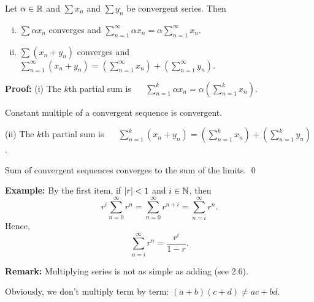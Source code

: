 \documentclass[10pt,aspectratio=149]{beamer}
\begin{document}
\begin{frame}

\begin{proposition}
Let $\alpha \in {\mathbb{R}}$ and $\sum x_n$ and $\sum y_n$ be
convergent series.
\pause
Then
\begin{enumerate}[(i)]
\item
$\sum \alpha x_n$ converges and \quad
$\displaystyle
\sum_{n=1}^\infty \alpha x_n
=
\alpha \sum_{n=1}^\infty x_n$.
\item\pause
$\sum ( x_n + y_n )$ converges and \quad
$\displaystyle
\sum_{n=1}^\infty ( x_n + y_n ) 
=
\left( \sum_{n=1}^\infty x_n \right)
+
\left( \sum_{n=1}^\infty y_n \right)$.
\end{enumerate}
\end{proposition}

\pause
\textbf{Proof:}
(i)
The $k$th partial sum is 
~~
$\displaystyle
\sum_{n=1}^k \alpha x_n
=
\alpha \left( \sum_{n=1}^k x_n \right)$.

\pause
\medskip

Constant multiple of a convergent sequence is convergent.

\pause
\medskip

(ii) The $k$th partial sum is
~~
$\displaystyle
\sum_{n=1}^k ( x_n + y_n ) 
=
\left( \sum_{n=1}^k x_n \right)
+
\left( \sum_{n=1}^k y_n \right)$.

\pause
\medskip

Sum of convergent sequences converges to the sum of the limits.
\qed

\end{frame}

\begin{frame}

\textbf{Example:}
By the first item, if $\left\lvert {r} \right\rvert < 1$ and $i \in {\mathbb{N}}$, then
\begin{equation*}
r^i \sum_{n=0}^\infty r^n =
\sum_{n=0}^\infty r^{n+i}
=
\sum_{n=i}^\infty r^n .
\end{equation*}
\pause
Hence,
\begin{equation*}
\sum_{n=i}^\infty r^n = \frac{r^i}{1-r} .
\end{equation*}

\pause
\medskip

\textbf{Remark:}
Multiplying series is not as simple as adding (see 2.6).

\pause
Obviously, we don't multiply term by term:
$(a+b)(c+d) \not= ac+bd$.

\end{frame}
\end{document}
